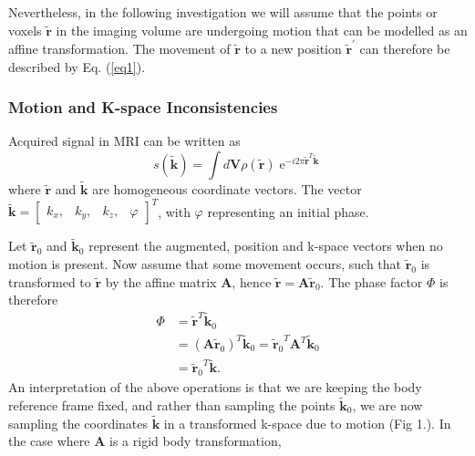 \documentclass[class=article, crop=false]{standalone}
\begin{document}
\par
Nevertheless, in the following investigation we will assume that the points or voxels $\tilde{\textbf{r}}$ in the imaging volume are undergoing motion that can be modelled as an affine transformation. The movement of $\tilde{\textbf{r}}$ to a new position $\tilde{\textbf{r}}^{'}$ can therefore be described by Eq. (\ref{eq1}).

\subsubsection*{Motion and K-space Inconsistencies}

Acquired signal in MRI can be written as
\begin{equation}
	\label{eq2}
	s(\tilde{\textbf{k}}) = \int d\textbf{V} \rho\left(\tilde{\textbf{r}}\right)\operatorname{e}^{-i2\pi\tilde{\textbf{r}}^{T}\tilde{\textbf{k}}}
\end{equation}
where $\tilde{\textbf{r}}$ and $\tilde{\textbf{k}}$ are homogeneous coordinate vectors. The vector $\tilde{\textbf{k}} = \begin{bmatrix}k_{x},&k_{y},&k_{z},&\varphi\end{bmatrix}^{T}$, with $\varphi$ representing an initial phase.
\par
Let $\tilde{\textbf{r}}_0$ and $\tilde{\textbf{k}}_0$ represent the augmented, position and k-space vectors when no motion is present. Now assume that some movement occurs, such that $\tilde{\textbf{r}}_0$ is transformed to $\tilde{\textbf{r}}$ by the affine matrix \textbf{A}, hence $\tilde{\textbf{r}} = \textbf{A}\tilde{\textbf{r}}_0$. The phase factor $\Phi$ is therefore
\begin{equation} \label{eq3}
	\begin{split}
		\Phi & = \tilde{\textbf{r}}^T\tilde{\textbf{k}}_0 \\ 
			 & = (\textbf{A}\tilde{\textbf{r}}_0)^T\tilde{\textbf{k}}_0
		     = {\tilde{\textbf{r}}_0}^T\textbf{A}^T\tilde{\textbf{k}}_0 \\
		     & = {\tilde{\textbf{r}}_0}^T\tilde{\textbf{k}}.
	\end{split}
\end{equation}
An interpretation of the above operations is that we are keeping the body reference frame fixed, and rather than sampling the points $\tilde{\textbf{k}}_0$, we are now sampling the coordinates $\tilde{\textbf{k}}$ in a transformed k-space due to motion (Fig 1.). In the case where \textbf{A} is a rigid body transformation,
\end{document}
